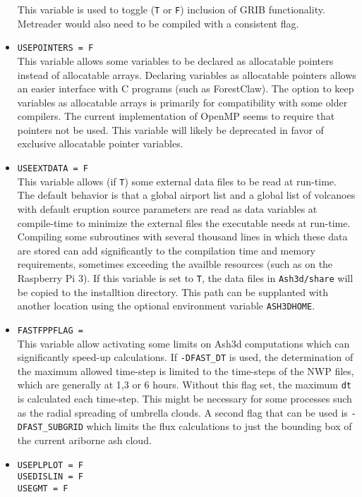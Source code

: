 \begin{itemize}
This variable is used to toggle (\texttt{T} or \texttt{F}) inclusion of GRIB
functionality.  Metreader would also need to be compiled with a consistent flag.
 \item \texttt{USEPOINTERS = F}\\
This variable allows some variables to be declared as allocatable pointers instead
of allocatable arrays.  Declaring variables as allocatable pointers allows an easier
interface with C programs (such as ForestClaw).  The option to keep variables as
allocatable arrays is primarily for compatibility with some older compilers.  The
current implementation of OpenMP seems to require that pointers not be used.
This variable
will likely be deprecated in favor of exclusive allocatable pointer variables.
 \item \texttt{USEEXTDATA = F}\\
This variable allows (if \texttt{T}) some external data files to be read at run-time.
The default behavior is that a global airport list and a global list of volcanoes with
default eruption source parameters are read as data variables at compile-time
to minimize the external files the executable needs at run-time.  Compiling
some subroutines with several thousand lines in which these data are stored can add
significantly to the compilation time and memory requirements, sometimes exceeding
the availble resources (such as on the Raspberry Pi 3).  If this variable is set to
\texttt{T}, the data files in \texttt{Ash3d/share} will be copied to the installtion
directory.  This path can be supplanted with another location using the optional
environment variable \texttt{ASH3DHOME}.
 \item \texttt{FASTFPPFLAG = }\\
This variable allow activating some limits on Ash3d computations which can significantly
speed-up calculations.  If \texttt{-DFAST\_DT} is used, the determination of the
maximum allowed time-step is limited to the time-steps of the NWP files, which are
generally at 1,3 or 6 hours.  Without this flag set, the maximum \texttt{dt} is
calculated each time-step.  This might be necessary for some processes such as
the radial spreading of umbrella clouds.  A second flag that can be used is
\texttt{-DFAST\_SUBGRID} which limits the flux calculations to just the bounding
box of the current ariborne ash cloud.
 \item \texttt{USEPLPLOT = F}\\
 \texttt{USEDISLIN = F}\\
 \texttt{USEGMT = F}\\

\end{itemize}
